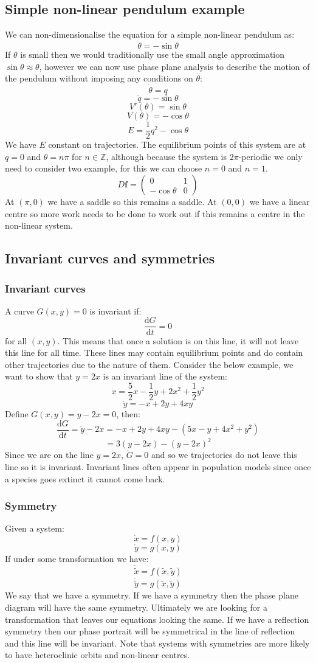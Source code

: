 \documentclass[12pt]{article}
\newcommand{\df}[2]{\frac{\text{d}#1}{\text{d}#2}}
\begin{document}
\subsection*{Simple non-linear pendulum example}
We can non-dimensionalise the equation for a simple non-linear pendulum as:
\[\ddot{\theta}=-\sin{\theta}\]
If \(\theta\) is small then we would traditionally use the small angle approximation \(\sin{\theta}\approx\theta \), however we can now use phase plane analysis to describe the motion of the pendulum without imposing any conditions on \(\theta\):
\[\dot{\theta}=q\]
\[\dot{q}=-\sin \theta\]
\[V'(\theta)=\sin\theta\]
\[V(\theta)=-\cos{\theta}\]
\[E=\frac{1}{2}q^2-\cos{\theta}\]
We have \(E\) constant on trajectories. The equilibrium points of this system are at \(q=0\) and \(\theta=n\pi\) for \(n\in\mathbb{Z}\), although because the system is \(2\pi\)-periodic we only need to consider two example, for this we can choose \(n=0\) and \(n=1\).
\[D\textbf{f}=\begin{pmatrix}
    0 & 1 \\
    -\cos{\theta} & 0
\end{pmatrix}\]
At \((\pi,0)\) we have a saddle so this remains a saddle. At \((0,0)\) we have a linear centre so more work needs to be done to work out if this remains a centre in the non-linear system.
\subsection*{Invariant curves and symmetries}
\subsubsection*{Invariant curves}
A curve \(G(x,y)=0\) is invariant if:
\[\df{G}{t}=0\]
for all \((x,y)\). This means that once a solution is on this line, it will not leave this line for all time. These lines may contain equilibrium points and do contain other trajectories due to the nature of them. Consider the below example, we want to show that \(y=2x\) is an invariant line of the system:
\[\dot{x}=\frac{5}{2}x-\frac{1}{2}y+2x^2+\frac{1}{2}y^2\]
\[\dot{y}=-x+2y+4xy\]
Define \(G(x,y)=y-2x=0\), then:
\[\df{G}{t}=\dot{y}-2\dot{x}=-x+2y+4xy-(5x-y+4x^2+y^2)\]
\[=3(y-2x)-(y-2x)^2\]
Since we are on the line \(y=2x\), \(\dot{G}=0\) and so we trajectories do not leave this line so it is invariant.  Invariant lines often appear in population models since once a species goes extinct it cannot come back.
\subsubsection*{Symmetry}
Given a system:
\[\dot{x}=f(x,y)\]
\[\dot{y}=g(x,y)\]
If under some transformation we have:
\[\dot{\tilde{x}}=f(\tilde{x},\tilde{y})\]
\[\dot{\tilde{y}}=g(\tilde{x},\tilde{y})\]
We say that we have a symmetry. If we have a symmetry then the phase plane diagram will have the same symmetry. Ultimately we are looking for a transformation that leaves our equations looking the same. If we have a reflection symmetry then our phase portrait will be symmetrical in the line of reflection and this line will be invariant. Note that systems with symmetries are more likely to have heteroclinic orbits and non-linear centres.
\end{document}
